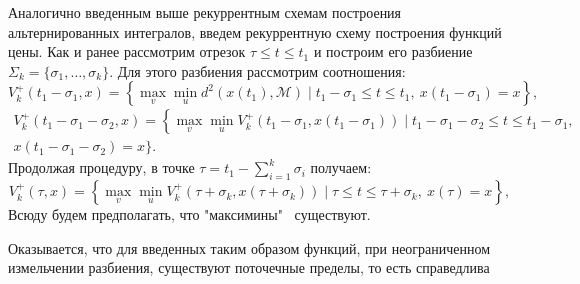 Аналогично введенным выше рекуррентным схемам построения альтернированных интегралов, 
введем рекуррентную схему построения функций цены. Как и ранее рассмотрим отрезок
 \( \tau \le t \le t_1 \) и построим его разбиение \( \Sigma_k = \{ \sigma_1, \dots, \sigma_k \} \).
 Для этого разбиения рассмотрим соотношения:
\begin{equation*}
    V_k^+(t_1 - \sigma_1, x) = \left\{ \max_v \min_u d^2(x(t_1), \mathcal{M}) \mid t_1 -
     \sigma_1 \le t \le t_1, \ x(t_1 - \sigma_1) = x \right\},
\end{equation*}
\begin{multline*} 
    V_k^+(t_1 - \sigma_1 - \sigma_2, x) = \left\{ \max_v \min_u V_k^+(t_1 - \sigma_1, x(t_1 -
     \sigma_1)) \mid t_1 - \sigma_1 - \sigma_2 \le t \le t_1 - \sigma_1, \right. \\ 
    x(t_1 - \sigma_1 - \sigma_2) = x \Big\}.
\end{multline*}
Продолжая процедуру, в точке \( \tau = t_1 - \sum\limits_{i = 1}^k \sigma_i \) получаем:
\begin{equation*}
    V_k^+(\tau, x) = \left\{ \max_v \min_u V_k^+ (\tau + \sigma_k, x(\tau + \sigma_k)) \mid
     \tau \le t \le \tau + \sigma_k, \ x(\tau) = x \right\},
\end{equation*}
Всюду будем предполагать, что "максимины" \ существуют.

Оказывается, что для введенных таким образом функций, при неограниченном измельчении разбиения,
 существуют поточечные пределы, то есть справедлива


